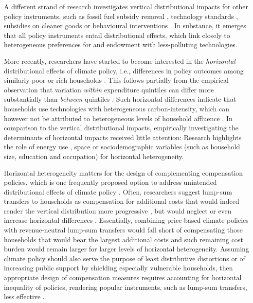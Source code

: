 \documentclass[12pt, a4paper]{article}
\begin{document}
A different strand of research investigates vertical distributional impacts for other policy instruments, such as fossil fuel subsidy removal \autocite{Schaffitzel.2019,Giuliano.2020,DelArzeGranado.2012}, technology standards \autocite{Levinson.2019,Zhao.2022,Bruegge.2019}, subsidies on cleaner goods \autocite{Borenstein.2016,Vaishnav.2017,Winter.2019} or behavioural interventions \autocite{DellaValle.2020,Liebe.2021}. In substance, it emerges that all policy instruments entail distributional effects, which link closely to heterogeneous preferences for and endowment with less-polluting technologies. 

More recently, researchers have started to become interested in the \textit{horizontal} distributional effects of climate policy, i.e., differences in policy outcomes among similarly poor or rich households \autocite{Rausch.2011,Fischer.2019}. This follows partially from the empirical observation that variation \textit{within} expenditure quintiles can differ more substantially than \textit{between} quintiles \autocite{Cronin.2019,Steckel.2021b,Pizer.2019}. Such horizontal differences indicate that households use technologies with heterogeneous carbon-intensity, which can however not be attributed to heterogeneous levels of household affluence \autocite{Hansel.2022}. In comparison to the vertical distributional impacts, empirically investigating the determinants of horizontal impacts received little attention: Research highlights the role of energy use \autocite{Steckel.2021b,Missbach.2024}, space \autocite{Chan.2023,Burtraw.2009} or sociodemographic variables (such as household size, education and occupation) \autocite{Grainger.2010,Buchs.2013,Farrell.2017,Missbach.2023} for horizontal heterogeneity.

Horizontal heterogeneity matters for the design of complementing compensation policies, which is one frequently proposed option to address unintended distributional effects of climate policy \autocite{Klenert.2018,Baranzini.2017}. Often, researchers suggest lump-sum transfers to households as compensation for additional costs \autocite{TerryDinan.2016,Stiglitz.2017,Baranzini.2000} that would indeed render the vertical distribution more progressive \autocite{Budolfson.2021,vanderPloeg.2022}, but would neglect or even increase horizontal differences \autocite{Cronin.2019,Hansel.2022}. Essentially, combining price-based climate policies with revenue-neutral lump-sum transfers would fall short of compensating those households that would bear the largest additional costs and such remaining cost burden would remain larger for larger levels of horizontal heterogeneity. Assuming climate policy should also serve the purpose of least distributive distortions \autocite{Fischer.2019} or of increasing public support by shielding especially vulnerable households, then appropriate design of compensation measures requires accounting for horizontal inequality of policies, rendering popular instruments, such as lump-sum transfers, less effective \autocite{Fullerton.2019,Missbach.2024}. 
\end{document}
